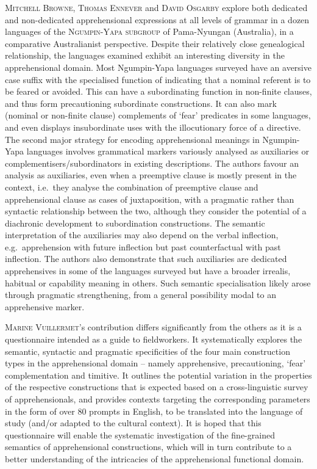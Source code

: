 \documentclass[output=paper,colorlinks,citecolor=brown
]{langscibook}
\begin{document}
\textsc{Mitchell} \textsc{Browne}, \textsc{Thomas} \textsc{Ennever} and \textsc{David} \textsc{Osgarby} explore both dedicated and non-dedicated apprehensional expressions at all levels of grammar in a dozen languages of the \textsc{Ngumpin-Yapa subgroup} of Pama-Nyungan (Australia), in a comparative Australianist perspective. Despite their relatively close genealogical relationship, the languages examined exhibit an interesting diversity in the apprehensional domain. Most Ngumpin-Yapa languages surveyed have an aversive case suffix with the specialised function of indicating that a nominal referent is to be feared or avoided. This can have a subordinating function in non-finite clauses, and thus form precautioning subordinate constructions. It can also mark (nominal or non-finite clause) complements of `fear' predicates in some languages, and even displays insubordinate uses with the illocutionary force of a directive. The second major strategy for encoding apprehensional meanings in Ngumpin-Yapa languages involves grammatical markers variously analysed as auxiliaries or complementisers/subordinators in existing descriptions. The authors favour an analysis as auxiliaries, even when a preemptive clause is mostly present in the context, i.e.\ they analyse the combination of preemptive clause and apprehensional clause as cases of juxtaposition, with a pragmatic rather than syntactic relationship between the two, although they consider the potential of a diachronic development to subordination constructions. The semantic interpretation of the auxiliaries may also depend on the verbal inflection, e.g.\  apprehension with future inflection but past counterfactual with past inflection. The authors also demonstrate that such auxiliaries are dedicated apprehensives in some of the languages surveyed but have a broader irrealis, habitual or capability meaning in others. Such semantic specialisation likely arose through pragmatic strengthening, from a general possibility modal to an apprehensive marker.


\textsc{Marine Vuillermet}'s contribution differs significantly from the others as it is a questionnaire intended as a guide to fieldworkers. It systematically explores the semantic, syntactic and pragmatic specificities of the four main construction types in the apprehensional domain – namely apprehensive, precautioning, `fear' complementation and timitive. It outlines the potential variation in the properties of the respective constructions that is expected based on a cross-linguistic survey of apprehensionals, and provides contexts targeting the corresponding parameters in the form of over 80 prompts in English, to be translated into the language of study (and/or adapted to the cultural context). It is hoped that this questionnaire will enable the systematic investigation of the fine-grained semantics of apprehensional constructions, which will in turn contribute to a better understanding of the intricacies of the apprehensional functional domain.
\end{document}
